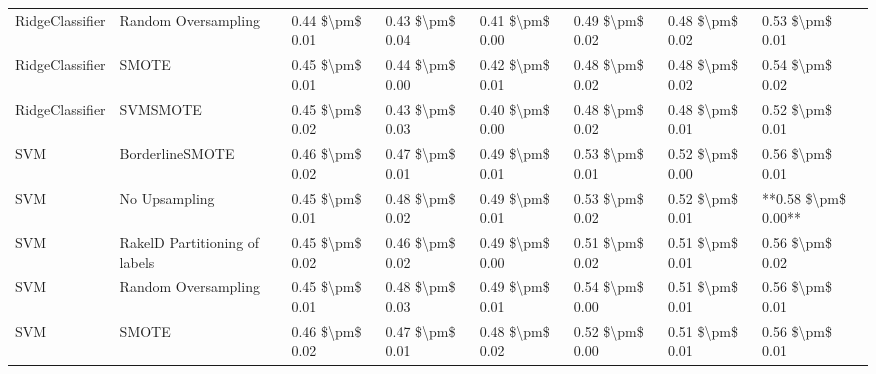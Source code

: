 \begin{tabular}{llllllll}
                RidgeClassifier &           Random Oversampling & 0.44 \$\textbackslash pm\$ 0.01 &           0.43 \$\textbackslash pm\$ 0.04 &       0.41 \$\textbackslash pm\$ 0.00 &        0.49 \$\textbackslash pm\$ 0.02 &                         0.48 \$\textbackslash pm\$ 0.02 &     0.53 \$\textbackslash pm\$ 0.01 \\
                RidgeClassifier &                         SMOTE & 0.45 \$\textbackslash pm\$ 0.01 &           0.44 \$\textbackslash pm\$ 0.00 &       0.42 \$\textbackslash pm\$ 0.01 &        0.48 \$\textbackslash pm\$ 0.02 &                         0.48 \$\textbackslash pm\$ 0.02 &     0.54 \$\textbackslash pm\$ 0.02 \\
                RidgeClassifier &                      SVMSMOTE & 0.45 \$\textbackslash pm\$ 0.02 &           0.43 \$\textbackslash pm\$ 0.03 &       0.40 \$\textbackslash pm\$ 0.00 &        0.48 \$\textbackslash pm\$ 0.02 &                         0.48 \$\textbackslash pm\$ 0.01 &     0.52 \$\textbackslash pm\$ 0.01 \\
                            SVM &               BorderlineSMOTE & 0.46 \$\textbackslash pm\$ 0.02 &           0.47 \$\textbackslash pm\$ 0.01 &       0.49 \$\textbackslash pm\$ 0.01 &        0.53 \$\textbackslash pm\$ 0.01 &                         0.52 \$\textbackslash pm\$ 0.00 &     0.56 \$\textbackslash pm\$ 0.01 \\
                            SVM &                 No Upsampling & 0.45 \$\textbackslash pm\$ 0.01 &           0.48 \$\textbackslash pm\$ 0.02 &       0.49 \$\textbackslash pm\$ 0.01 &        0.53 \$\textbackslash pm\$ 0.02 &                         0.52 \$\textbackslash pm\$ 0.01 & **0.58 \$\textbackslash pm\$ 0.00** \\
                            SVM & RakelD Partitioning of labels & 0.45 \$\textbackslash pm\$ 0.02 &           0.46 \$\textbackslash pm\$ 0.02 &       0.49 \$\textbackslash pm\$ 0.00 &        0.51 \$\textbackslash pm\$ 0.02 &                         0.51 \$\textbackslash pm\$ 0.01 &     0.56 \$\textbackslash pm\$ 0.02 \\
                            SVM &           Random Oversampling & 0.45 \$\textbackslash pm\$ 0.01 &           0.48 \$\textbackslash pm\$ 0.03 &       0.49 \$\textbackslash pm\$ 0.01 &        0.54 \$\textbackslash pm\$ 0.00 &                         0.51 \$\textbackslash pm\$ 0.01 &     0.56 \$\textbackslash pm\$ 0.01 \\
                            SVM &                         SMOTE & 0.46 \$\textbackslash pm\$ 0.02 &           0.47 \$\textbackslash pm\$ 0.01 &       0.48 \$\textbackslash pm\$ 0.02 &        0.52 \$\textbackslash pm\$ 0.00 &                         0.51 \$\textbackslash pm\$ 0.01 &     0.56 \$\textbackslash pm\$ 0.01 \\

\end{tabular}
